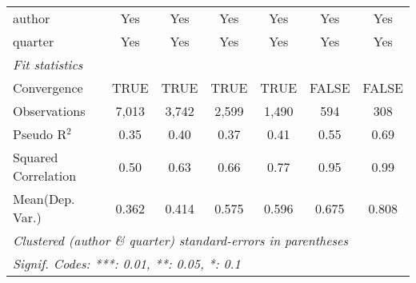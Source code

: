 \begin{tabular}{lcccccc}
   author                                                     & Yes           & Yes           & Yes          & Yes           & Yes           & Yes\\  
   quarter                                                    & Yes           & Yes           & Yes          & Yes           & Yes           & Yes\\  
   \midrule
   \emph{Fit statistics}\\
   Convergence                                                &TRUE           & TRUE          & TRUE         & TRUE          & FALSE         & FALSE\\  
   Observations                                               & 7,013         & 3,742         & 2,599        & 1,490         & 594           & 308\\  
   Pseudo R$^2$                                               & 0.35          & 0.40          & 0.37         & 0.41          & 0.55          & 0.69\\  
   Squared Correlation                                        & 0.50          & 0.63          & 0.66         & 0.77          & 0.95          & 0.99\\  
Mean(Dep. Var.) & 0.362 & 0.414 & 0.575 & 0.596 & 0.675 & 0.808 \\
   \midrule \midrule
   \multicolumn{7}{l}{\emph{Clustered (author \& quarter) standard-errors in parentheses}}\\
   \multicolumn{7}{l}{\emph{Signif. Codes: ***: 0.01, **: 0.05, *: 0.1}}\\
\end{tabular}
\par\endgroup
